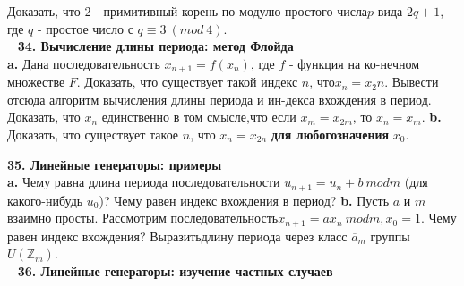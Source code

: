 \documentclass{mai_book}
\begin{document}
	Доказать, что 2 - примитивный корень по модулю простого числа\newline $p$ вида $2q+1$, где  $q$ - простое число с $q\equiv 3\ (mod\ 4)$.\\
	\ \newline
\noindent\textbf{34. Вычисление длины периода: метод Флойда}\\

\textbf{a.} Дана последовательность $x_{n+1}=f(x_n)$, где $f$ - функция на ко-\newline нечном множестве $F$. Доказать, что существует такой индекс $n$, что\newline $x_n=x_2n$. Вывести отсюда алгоритм вычисления длины периода и ин-\newline декса вхождения в период. Доказать, что $x_n$ единственно в том смысле,\newline что если $x_m=x_{2m}$, то $x_n=x_m$.\newline
\hspace*{15pt}\textbf{b.} Доказать, что существует такое $n$, что $x_n=x_{2n}$ \textbf{для любого\newline значения} $x_0$.\newline

\newpage

\noindent\textbf{35. Линейные генераторы: примеры}\\

\textbf{a.} Чему равна длина периода последовательности $u_{n+1}=u_n+b\ mod$\newline $m$ (для какого-нибудь $u_0$)? Чему равен индекс вхождения в период?\newline
\hspace*{15pt}\textbf{b.} Пусть $a$ и $m$ взаимно просты. Рассмотрим последовательность\newline $x_{n+1}=ax_n\ mod m, x_0=1$. Чему равен индекс вхождения? Выразить\newline длину периода через класс $\overline{a}_m$ группы $U(\mathbb{Z}_m)$.\\
\ \newline
\noindent\textbf{36. Линейные генераторы: изучение частных случаев}\\
\end{document}
